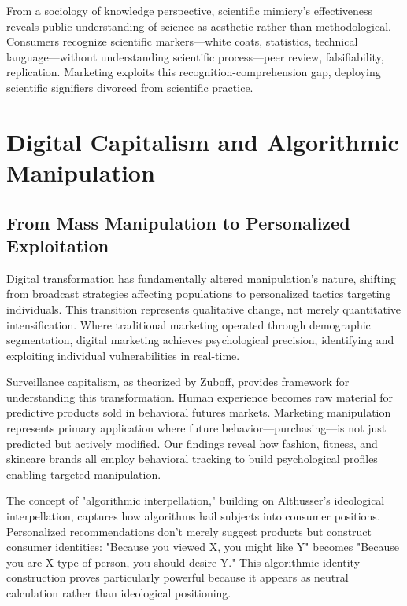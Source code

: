 From a sociology of knowledge perspective, scientific mimicry's effectiveness reveals public understanding of science as aesthetic rather than methodological. Consumers recognize scientific markers—white coats, statistics, technical language—without understanding scientific process—peer review, falsifiability, replication. Marketing exploits this recognition-comprehension gap, deploying scientific signifiers divorced from scientific practice.

\section{Digital Capitalism and Algorithmic Manipulation}
\label{sec:digital_capitalism}

\subsection{From Mass Manipulation to Personalized Exploitation}

Digital transformation has fundamentally altered manipulation's nature, shifting from broadcast strategies affecting populations to personalized tactics targeting individuals. This transition represents qualitative change, not merely quantitative intensification. Where traditional marketing operated through demographic segmentation, digital marketing achieves psychological precision, identifying and exploiting individual vulnerabilities in real-time.

Surveillance capitalism, as theorized by Zuboff, provides framework for understanding this transformation. Human experience becomes raw material for predictive products sold in behavioral futures markets. Marketing manipulation represents primary application where future behavior—purchasing—is not just predicted but actively modified. Our findings reveal how fashion, fitness, and skincare brands all employ behavioral tracking to build psychological profiles enabling targeted manipulation.

The concept of "algorithmic interpellation," building on Althusser's ideological interpellation, captures how algorithms hail subjects into consumer positions. Personalized recommendations don't merely suggest products but construct consumer identities: "Because you viewed X, you might like Y" becomes "Because you are X type of person, you should desire Y." This algorithmic identity construction proves particularly powerful because it appears as neutral calculation rather than ideological positioning.

